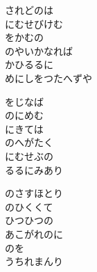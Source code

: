 \documentclass[10pt,b5j]{tarticle} %
\begin{document}
\begin{enumerate}
\begin{minipage}[c]{\blocksize}
        \vspace{\linespace}
        \item
        されどのは\\
        にむせびけむ\\
        をかむの\\
        のやいかなれば\\
        かひるるに\\
        めにしをつたへずや
        
        \vspace{\linespace}
        \item
        をじなば\\
        のにめむ\\
        にきては\\
        のへがたく\\
        にむせぶの\\
        るるにみあり
        
        \vspace{\linespace}
        \item
        のさすほとり\\
        のひくくて\\
        ひつひつの\\
        あこがれのに\\
        のを\\
        うちれまんり
    
    \end{minipage}
\end{enumerate} %
\end{document}
